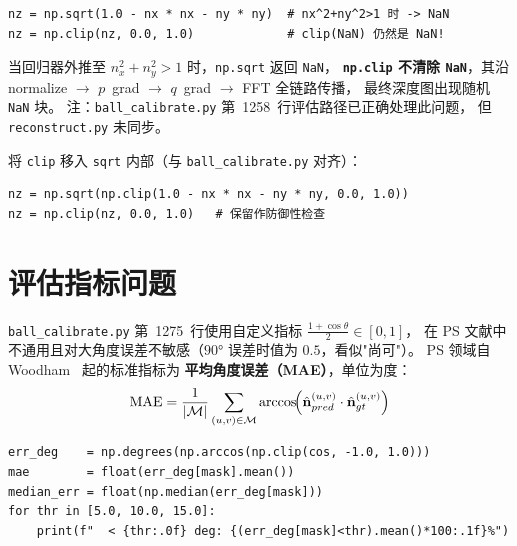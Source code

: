 \begin{lstlisting}[caption={clip 在 sqrt 之后无法清除 NaN（reconstruct.py）}]
nz = np.sqrt(1.0 - nx * nx - ny * ny)  # nx^2+ny^2>1 时 -> NaN
nz = np.clip(nz, 0.0, 1.0)             # clip(NaN) 仍然是 NaN!
\end{lstlisting}

\begin{bugbox}
当回归器外推至 $n_x^2 + n_y^2 > 1$ 时，\texttt{np.sqrt} 返回 \texttt{NaN}，
\textbf{\texttt{np.clip} 不清除 \texttt{NaN}}，其沿
normalize $\to$ $p$~grad $\to$ $q$~grad $\to$ FFT 全链路传播，
最终深度图出现随机 \texttt{NaN} 块。
注：\texttt{ball\_calibrate.py} 第~1258~行评估路径已正确处理此问题，
但 \texttt{reconstruct.py} 未同步。
\end{bugbox}

\begin{fixbox}
将 \texttt{clip} 移入 \texttt{sqrt} 内部（与 \texttt{ball\_calibrate.py} 对齐）：

\begin{lstlisting}
nz = np.sqrt(np.clip(1.0 - nx * nx - ny * ny, 0.0, 1.0))
nz = np.clip(nz, 0.0, 1.0)   # 保留作防御性检查
\end{lstlisting}
\end{fixbox}

\section{评估指标问题}
\label{sec:eval}

\texttt{ball\_calibrate.py} 第~1275~行使用自定义指标
$\tfrac{1+\cos\theta}{2} \in [0,1]$，
在 PS 文献中不通用且对大角度误差不敏感（$90°$ 误差时值为 $0.5$，看似"尚可"）。
PS 领域自 Woodham~\cite{woodham1980photometric} 起的标准指标为
\textbf{平均角度误差（MAE）}，单位为度：
\[
  \mathrm{MAE}
  = \frac{1}{|\mathcal{M}|}
    \sum_{(u,v)\in\mathcal{M}}
    \arccos\!\Bigl(
      \hat{\mathbf{n}}_{pred}^{(u,v)} \cdot \hat{\mathbf{n}}_{gt}^{(u,v)}
    \Bigr)
\]

\begin{fixbox}
\begin{lstlisting}
err_deg    = np.degrees(np.arccos(np.clip(cos, -1.0, 1.0)))
mae        = float(err_deg[mask].mean())
median_err = float(np.median(err_deg[mask]))
for thr in [5.0, 10.0, 15.0]:
    print(f"  < {thr:.0f} deg: {(err_deg[mask]<thr).mean()*100:.1f}%")
\end{lstlisting}
\end{fixbox}

